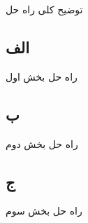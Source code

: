 توضیح کلی راه حل

\subsection*{الف}
راه حل بخش اول 


\subsection*{ب}
راه حل بخش دوم 

\subsection*{ج}
راه حل بخش سوم